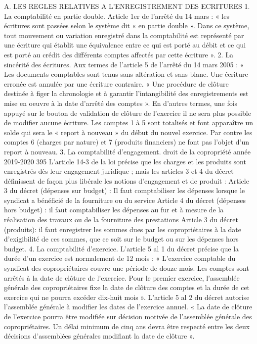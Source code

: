 A. LES REGLES RELATIVES A L’ENREGISTREMENT DES ECRITURES
1. La comptabilité en partie double.
Article 1er de l’arrêté du 14 mars :
« les écritures sont passées selon le système dit « en partie double ». Dans ce système, tout mouvement ou variation enregistré dans la comptabilité est représenté par une écriture qui établit une équivalence entre ce qui est porté au débit et ce qui est porté au crédit des différents comptes affectés par cette écriture ».
2. La sincérité des écritures.
Aux termes de l’article 5 de l’arrêté du 14 mars 2005 :
« Les documents comptables sont tenus sans altération et sans blanc. Une écriture erronée est annulée par une écriture contraire.
« Une procédure de clôture destinée à figer la chronologie et à garantir l’intangibilité des enregistrements est mise en oeuvre à la date d’arrêté des comptes ».
En d’autres termes, une fois appuyé sur le bouton de validation de clôture de l’exercice il ne sera plus possible de modifier aucune écriture.
Les comptes 1 à 5 sont totalisés et font apparaître un solde qui sera le « report à nouveau » du début du nouvel exercice. Par contre les comptes 6 (charges par nature) et 7 (produits financiers) ne font pas l’objet d’un report à nouveau.
3. La comptabilité d’engagement.
droit de la copropriété année 2019-2020
395
L’article 14-3 de la loi précise que les charges et les produits sont enregistrés dès leur engagement juridique ; mais les articles 3 et 4 du décret définissent de façon plus libérale les notions d’engagement et de produit :
Article 3 du décret (dépenses sur budget) : Il faut comptabiliser les dépenses lorsque le syndicat a bénéficié de la fourniture ou du service
Article 4 du décret (dépenses hors budget) : il faut comptabiliser les dépenses au fur et à mesure de la réalisation des travaux ou de la fourniture des prestations
Article 3 du décret (produits): il faut enregistrer les sommes dues par les copropriétaires à la date d’exigibilité de ces sommes, que ce soit sur le budget ou sur les dépenses hors budget.
4. La comptabilité d’exercice.
L’article 5 al 1 du décret précise que la durée d’un exercice est normalement de 12 mois :
« L’exercice comptable du syndicat des copropriétaires couvre une période de douze mois. Les comptes sont arrêtés à la date de clôture de l’exercice. Pour le premier exercice, l’assemblée générale des copropriétaires fixe la date de clôture des comptes et la durée de cet exercice qui ne pourra excéder dix-huit mois ».
L’article 5 al 2 du décret autorise l'assemblée générale à modifier les dates de l’exercice annuel.
« La date de clôture de l’exercice pourra être modifiée sur décision motivée de l’assemblée générale des copropriétaires. Un délai minimum de cinq ans devra être respecté entre les deux décisions d’assemblées générales modifiant la date de clôture ».
